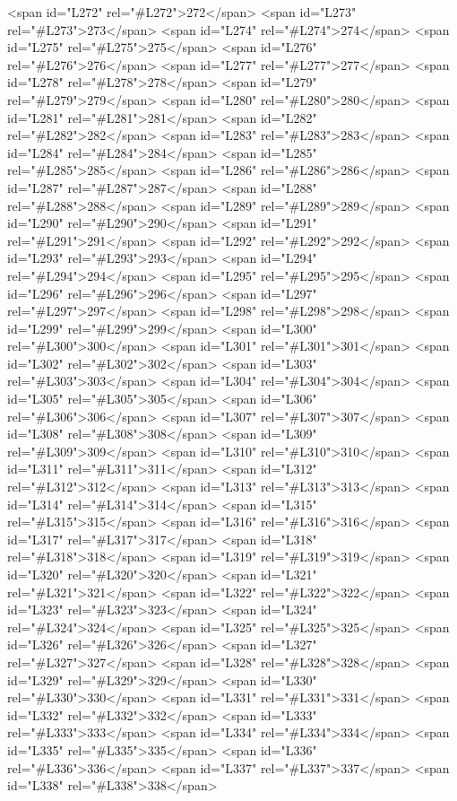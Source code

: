 <span id="L272" rel="#L272">272</span>
<span id="L273" rel="#L273">273</span>
<span id="L274" rel="#L274">274</span>
<span id="L275" rel="#L275">275</span>
<span id="L276" rel="#L276">276</span>
<span id="L277" rel="#L277">277</span>
<span id="L278" rel="#L278">278</span>
<span id="L279" rel="#L279">279</span>
<span id="L280" rel="#L280">280</span>
<span id="L281" rel="#L281">281</span>
<span id="L282" rel="#L282">282</span>
<span id="L283" rel="#L283">283</span>
<span id="L284" rel="#L284">284</span>
<span id="L285" rel="#L285">285</span>
<span id="L286" rel="#L286">286</span>
<span id="L287" rel="#L287">287</span>
<span id="L288" rel="#L288">288</span>
<span id="L289" rel="#L289">289</span>
<span id="L290" rel="#L290">290</span>
<span id="L291" rel="#L291">291</span>
<span id="L292" rel="#L292">292</span>
<span id="L293" rel="#L293">293</span>
<span id="L294" rel="#L294">294</span>
<span id="L295" rel="#L295">295</span>
<span id="L296" rel="#L296">296</span>
<span id="L297" rel="#L297">297</span>
<span id="L298" rel="#L298">298</span>
<span id="L299" rel="#L299">299</span>
<span id="L300" rel="#L300">300</span>
<span id="L301" rel="#L301">301</span>
<span id="L302" rel="#L302">302</span>
<span id="L303" rel="#L303">303</span>
<span id="L304" rel="#L304">304</span>
<span id="L305" rel="#L305">305</span>
<span id="L306" rel="#L306">306</span>
<span id="L307" rel="#L307">307</span>
<span id="L308" rel="#L308">308</span>
<span id="L309" rel="#L309">309</span>
<span id="L310" rel="#L310">310</span>
<span id="L311" rel="#L311">311</span>
<span id="L312" rel="#L312">312</span>
<span id="L313" rel="#L313">313</span>
<span id="L314" rel="#L314">314</span>
<span id="L315" rel="#L315">315</span>
<span id="L316" rel="#L316">316</span>
<span id="L317" rel="#L317">317</span>
<span id="L318" rel="#L318">318</span>
<span id="L319" rel="#L319">319</span>
<span id="L320" rel="#L320">320</span>
<span id="L321" rel="#L321">321</span>
<span id="L322" rel="#L322">322</span>
<span id="L323" rel="#L323">323</span>
<span id="L324" rel="#L324">324</span>
<span id="L325" rel="#L325">325</span>
<span id="L326" rel="#L326">326</span>
<span id="L327" rel="#L327">327</span>
<span id="L328" rel="#L328">328</span>
<span id="L329" rel="#L329">329</span>
<span id="L330" rel="#L330">330</span>
<span id="L331" rel="#L331">331</span>
<span id="L332" rel="#L332">332</span>
<span id="L333" rel="#L333">333</span>
<span id="L334" rel="#L334">334</span>
<span id="L335" rel="#L335">335</span>
<span id="L336" rel="#L336">336</span>
<span id="L337" rel="#L337">337</span>
<span id="L338" rel="#L338">338</span>
